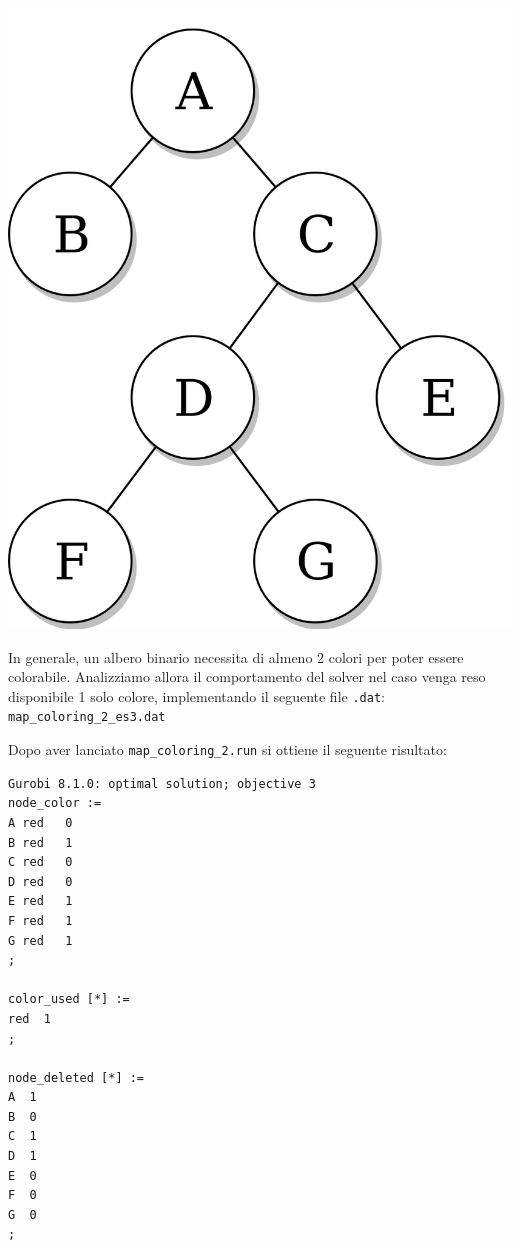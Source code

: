 \documentclass{article}
\begin{document}
\begin{center}
\includegraphics[scale=0.15]{tree.png}
\end{center}

In generale, un albero binario necessita di almeno 2 colori per poter essere colorabile. Analizziamo allora il comportamento del solver nel caso venga reso disponibile 1 solo colore, implementando il seguente file \texttt{.dat}:\\

\vspace{5mm}
\texttt{map\_coloring\_2\_es3.dat}

\vspace{5mm}

\pagebreak

Dopo aver lanciato \texttt{map\_coloring\_2.run} si ottiene il seguente risultato:\\

\begin{verbatim}
Gurobi 8.1.0: optimal solution; objective 3
node_color :=
A red   0
B red   1
C red   0
D red   0
E red   1
F red   1
G red   1
;

color_used [*] :=
red  1
;

node_deleted [*] :=
A  1
B  0
C  1
D  1
E  0
F  0
G  0
;
\end{verbatim}
\end{document}
